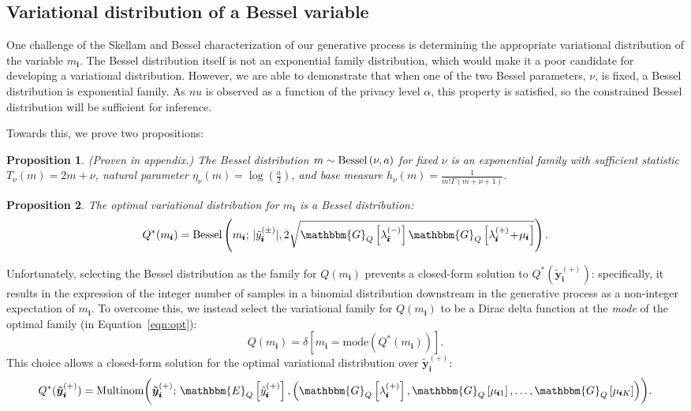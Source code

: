 \documentclass{article}
\newcommand{\subs}{\pmb{i}}
\newcommand{\wsup}[2]{#1_{\subs}^{(#2)}}
\newcommand{\ytP}{\wsup{\tilde{y}}{+}}
\newcommand{\ytPM}{\wsup{\tilde{y}}{\pm}}
\newcommand{\lamP}{\wsup{\lambda}{+}}
\newcommand{\lamM}{\wsup{\lambda}{-}}
\newcommand{\mus}{\mu_{\subs}}
\newcommand{\ms}{m_{\subs}}
\newcommand{\yvtP}{\boldsymbol{\tilde{y}}_{\subs}^{(+)}}
\newcommand{\Bess}[1]{\textup{Bessel}\left( #1 \right)}
\newcommand{\Eq}[1]{\mathbbm{E}_Q\left[#1\right]}
\newcommand{\Gq}[1]{\mathbbm{G}_Q\left[#1\right]}
\newcommand{\teq}{\!=\!}
\newcommand{\tp}{\!+\!}
\newtheorem{proposition}{Proposition}
\begin{document}
  \subsection{Variational distribution of a Bessel variable}
  
  One challenge of the Skellam and Bessel characterization of our generative
  process is determining the appropriate variational distribution of the
  variable $\ms$. The Bessel distribution itself is not an exponential family
  distribution, which would make it a poor candidate for developing a
  variational distribution. However, we are able to demonstrate that when one of
  the two Bessel parameters, $\nu$, is fixed, a Bessel distribution is
  exponential family. As $nu$ is observed as a function of the privacy level
  $\alpha$, this property is satisfied, so the constrained Bessel distribution
  will be sufficient for inference.

  Towards this, we prove two propositions:
  
  \begin{proposition} (Proven in appendix.) The Bessel
  distribution $m \sim \Bess{\nu, a}$ for fixed $\nu$ is an exponential family
  with sufficient statistic $T_{\nu}(m) \teq 2m \tp \nu$, natural parameter
  $\eta_{\nu}(m)\teq \log(\frac{a}{2})$, and base measure $h_{\nu}(m) \teq
  \frac{1}{m!\Gamma(m\tp\nu\tp 1)}$. 
  \end{proposition}
  
  \begin{proposition} The optimal variational distribution for $\ms$ is a Bessel
  distribution:
  \begin{equation}
  \label{eqn:opt}
  Q^*(\ms) = \Bess{\ms; \, |\ytPM|, 2\sqrt{\Gq{\lamM}\Gq{\lamP \tp \mus}}}.
  \end{equation}
  \end{proposition}

  Unfortunately, selecting the Bessel distribution as the family for $Q(\ms)$
  prevents a closed-form solution to $Q^*(\yvtP)$: specifically, it results in
  the expression of the integer number of samples in a binomial distribution
  downstream in the generative process as a non-integer expectation of $\ms$. To
  overcome this, we instead select the variational family for $Q(\ms)$ to be a
  Dirac delta function at the \emph{mode} of the optimal family (in
  Equation~\ref{eqn:opt}):
  \begin{equation}
  Q(\ms) = \delta\left[\ms \teq \textrm{mode}(Q^*(\ms))\right].
  \end{equation}
  This choice allows a closed-form solution for the optimal variational
  distribution over $\yvtP$:
  \begin{equation}
  \label{eqn:opt-multi}
  Q^*(\yvtP) = \textup{Multinom} \biggl(\yvtP;\, \Eq{\ytP}, \left(\Gq{\lamP}, \Gq{\mu_{\subs 1}}, \dots, \Gq{\mu_{\subs K}} \right) \biggr).
  \end{equation}
\end{document}
